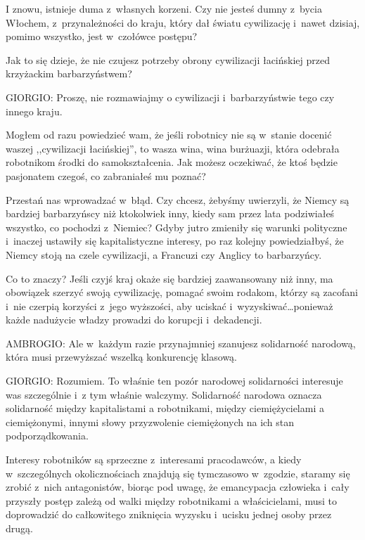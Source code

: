 \documentclass[oneside,polish,11pt,sfheadings]{mwbk}
\begin{document}
 
I znowu, istnieje duma z~własnych korzeni. Czy nie jesteś dumny z~bycia Włochem, z~przynależności do kraju, który dał
światu cywilizację i~nawet dzisiaj, pomimo wszystko, jest w~czołówce postępu? 

 
Jak to się dzieje, że nie czujesz potrzeby obrony cywilizacji łacińskiej przed krzyżackim barbarzyństwem? 




 
\noindent GIORGIO: Proszę, nie rozmawiajmy o cywilizacji i~barbarzyństwie tego czy innego kraju. 

 
Mogłem od razu powiedzieć wam, że jeśli robotnicy nie są w~stanie docenić waszej ,,cywilizacji łacińskiej'', to wasza
wina, wina burżuazji, która odebrała robotnikom środki do samokształcenia. Jak możesz oczekiwać, że ktoś będzie
pasjonatem czegoś, co zabraniałeś mu poznać? 

 
Przestań nas wprowadzać w~błąd. Czy chcesz, żebyśmy uwierzyli, że Niemcy są bardziej barbarzyńscy niż ktokolwiek inny,
kiedy sam przez lata podziwiałeś wszystko, co pochodzi z~Niemiec? Gdyby jutro zmieniły się warunki polityczne i~inaczej
ustawiły się kapitalistyczne interesy, po raz kolejny powiedziałbyś, że Niemcy stoją na czele cywilizacji, a Francuzi
czy Anglicy to barbarzyńcy. 

 
Co to znaczy? Jeśli czyjś kraj okaże się bardziej zaawansowany niż inny, ma obowiązek szerzyć swoją cywilizację, pomagać
swoim rodakom, którzy są zacofani i~nie czerpią korzyści z~jego wyższości, aby uciskać i~wyzyskiwać\ldots ponieważ każde
nadużycie władzy prowadzi do korupcji i~dekadencji. 




 
\noindent AMBROGIO: Ale w~każdym razie przynajmniej szanujesz solidarność narodową, która musi przewyższać wszelką konkurencję
klasową. 




 
\noindent GIORGIO: Rozumiem. To właśnie ten pozór narodowej solidarności interesuje was szczególnie i~z tym właśnie walczymy.
Solidarność narodowa oznacza solidarność między kapitalistami a robotnikami, między ciemiężycielami a ciemiężonymi,
innymi słowy przyzwolenie ciemiężonych na ich stan podporządkowania. 

 
Interesy robotników są sprzeczne z~interesami pracodawców, a kiedy w~szczególnych okolicznościach znajdują się
tymczasowo w~zgodzie, staramy się zrobić z~nich antagonistów, biorąc pod uwagę, że emancypacja człowieka i~cały
przyszły postęp zależą od walki między robotnikami a właścicielami, musi to doprowadzić do całkowitego zniknięcia
wyzysku i~ucisku jednej osoby przez drugą. 
\end{document}
